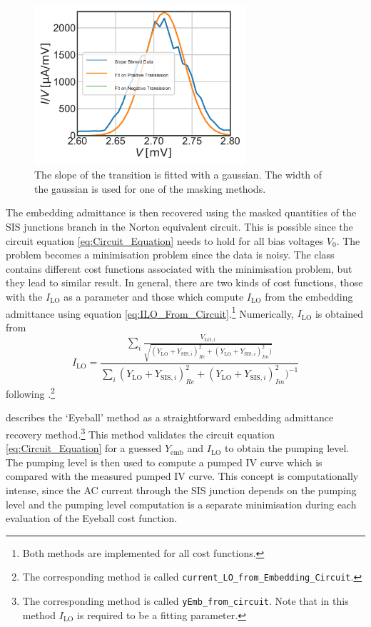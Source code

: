 \documentclass[]{article}
\begin{document}
\begin{figure}
	\centering
	\includegraphics[width=0.7\textwidth]{./../IV_Class_Unit_Test/2020_01_14/Gaussian_Fit_on_Positive_Slope.pdf}
	\caption{The slope of the transition is fitted with a gaussian. The width of the gaussian is used for one of the masking methods.}
	\label{fig:Gaussian_Fit_on_Positive_Slope}
\end{figure}

The embedding admittance is then recovered using the masked quantities of the SIS junctions branch in the Norton equivalent circuit. This is possible since the circuit equation \ref{eq:Circuit_Equation} needs to hold for all bias voltages $V_0$. The problem becomes a minimisation problem since the data is noisy. The class contains different cost functions associated with the minimisation problem, but they lead to similar result. In general, there are two kinds of cost functions, those with the $I_\text{LO}$ as a parameter and those which compute $I_\text{LO}$ from the embedding admittance using equation \ref{eq:ILO_From_Circuit}.\footnote{Both methods are implemented for all cost functions.} Numerically, $I_\text{LO}$ is obtained from
\begin{equation}\label{eq:ILO_Skalare}
I_\text{LO} = \frac{\sum_i 
	\frac{V_{\text{LO},i}}{\sqrt{ (Y_{\text{LO}}+Y_{\text{SIS},i})_{Re}^2+(Y_{\text{LO}}+Y_{\text{SIS},i})_{Im}^2) }}}{\sum_i (Y_{\text{LO}}+Y_{\text{SIS},i})_{Re}^2+(Y_{\text{LO}}+Y_{\text{SIS},i})_{Im}^2)^{-1} }
\end{equation}
following \cite{Skalare1989}.\footnote{The corresponding method is called \texttt{current\_LO\_from\_Embedding\_Circuit}.} 

\cite{Skalare1989} describes the `Eyeball' method as a straightforward embedding admittance recovery method.\footnote{The corresponding method is called \texttt{yEmb\_from\_circuit}. Note that in this method $I_\text{LO}$ is required to be a fitting parameter.} This method validates the circuit equation \ref{eq:Circuit_Equation} for a guessed $Y_\text{emb}$ and $I_\text{LO}$ to obtain the pumping level. The pumping level is then used to compute a pumped IV curve which is compared with the measured pumped IV curve. This concept is computationally intense, since the AC current through the SIS junction depends on the pumping level and the pumping level computation is a separate minimisation during each evaluation of the Eyeball cost function.
\end{document}

